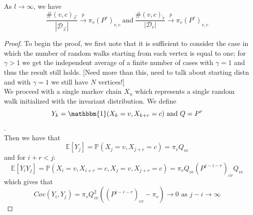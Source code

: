 \documentclass[a4paper]{article}
\renewcommand{\P}{\mathbb P}
\renewcommand{\E}{\mathbb E}
\newcommand{\D}{\mathcal D}
\newcommand{\rar}{\overrightarrow r}
\newcommand{\lar}{\overleftarrow r}
\begin{document}
\begin{lemma}
  As $l \to \infty$, we have
  \[\frac{\#(v, c)_{\rar}}{|\D_{\rar}|} \overset{p}{\longrightarrow} \pi_v(P^r)_{v,c} \  \text{and}
    \ \frac{\#(v, c)_{\lar}}{|\D_{\lar}|} \overset{p}{\longrightarrow} \pi_v(P^r)_{v,c} \]
\end{lemma}
\begin{proof}
To begin the proof, we first note that it is sufficient to consider the case in which the number
of random walks starting from each vertex is equal to one; for $\gamma > 1$ we get the independent average of
a finite number of cases with $\gamma = 1$ and thus the result still holds. [Need more than this, need to talk about starting distn and with $\gamma = 1$ we still have $N$ vertices!]\\
We proceed with a single markov chain $X_n$ which represents a single random walk initialized with the invariant distribution. We define $$Y_k = \mathbbm{1}(X_k = v, X_{k+r} = c) \text{ and } Q = P^r$$.\\
Then we have that
\[\E[Y_j] = \P(X_j = v, X_{j+r} = c) = \pi_vQ_{vc}\]
and for $i + r < j$:
\[\E[Y_iY_j] = \P(X_i = v, X_{i+r} = c, X_j = v, X_{j+r} = c) = \pi_vQ_{vc}(P^{j-i-r})_{cv}Q_{vc}\]
which gives that
\[Cov(Y_i, Y_j) = \pi_vQ_{vc}^2\left((P^{j-i-r})_{cv} - \pi_v\right) \to 0 \text{ as } j-i \to \infty\]
\end{proof}






\printindex
\end{document}
